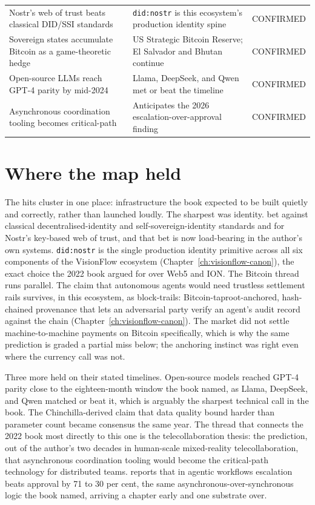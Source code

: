 \begin{table}[ht]
\begin{tabularx}{\textwidth}{L{4.6cm} X L{2.4cm}}
\addlinespace
Nostr's web of trust beats classical DID/SSI standards & \texttt{did:nostr} is this ecosystem's production identity spine & CONFIRMED \\
\addlinespace
Sovereign states accumulate Bitcoin as a game-theoretic hedge & US Strategic Bitcoin Reserve; El Salvador and Bhutan continue & CONFIRMED \\
\addlinespace
Open-source LLMs reach GPT-4 parity by mid-2024 & Llama, DeepSeek, and Qwen met or beat the timeline & CONFIRMED \\
\addlinespace
Asynchronous coordination tooling becomes critical-path & Anticipates the 2026 escalation-over-approval finding & CONFIRMED \\
\bottomrule
\end{tabularx}
\end{table}

\section{Where the map held}

The hits cluster in one place: infrastructure the book expected to be built quietly and correctly, rather than launched loudly. The sharpest was identity. \textcite{OHare2022Convergence} bet against classical decentralised-identity and self-sovereign-identity standards and for Nostr's key-based web of trust, and that bet is now load-bearing in the author's own systems. \texttt{did:nostr} is the single production identity primitive across all six components of the VisionFlow ecosystem (Chapter~\ref{ch:visionflow-canon}), the exact choice the 2022 book argued for over Web5 and ION. The Bitcoin thread runs parallel. The claim that autonomous agents would need trustless settlement rails survives, in this ecosystem, as block-trails: Bitcoin-taproot-anchored, hash-chained provenance that lets an adversarial party verify an agent's audit record against the chain (Chapter~\ref{ch:visionflow-canon}). The market did not settle machine-to-machine payments on Bitcoin specifically, which is why the same prediction is graded a partial miss below; the anchoring instinct was right even where the currency call was not.

Three more held on their stated timelines. Open-source models reached GPT-4 parity close to the eighteen-month window the book named, as Llama, DeepSeek, and Qwen matched or beat it, which is arguably the sharpest technical call in the book. The Chinchilla-derived claim that data quality bound harder than parameter count became consensus the same year. The thread that connects the 2022 book most directly to this one is the telecollaboration thesis: the prediction, out of the author's two decades in human-scale mixed-reality telecollaboration, that asynchronous coordination tooling would become the critical-path technology for distributed teams. \textcite{Pereira2026Playbook} reports that in agentic workflows escalation beats approval by 71 to 30 per cent, the same asynchronous-over-synchronous logic the book named, arriving a chapter early and one substrate over.


